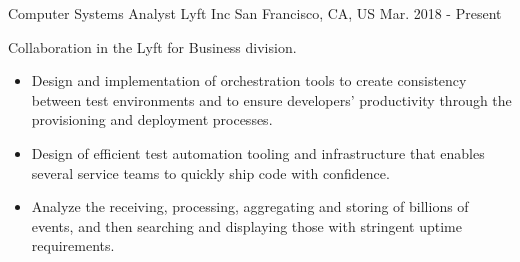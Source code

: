 


\begin{cventries}
	
	
	\cventry
	{Computer Systems Analyst} %
	{Lyft Inc} %
	{San Francisco, CA, US} %
	{Mar. 2018 - Present} %
	{ %
		\begin{cvitems}
			\item {Collaboration in the Lyft for Business division.}
			\begin{itemize}
				\item {Design and implementation of orchestration tools to create consistency between test environments and to ensure developers' productivity through the provisioning and deployment processes.}
				\item {Design of efficient test automation tooling and infrastructure that enables several service teams to quickly ship code with confidence.}
				\item {Analyze the receiving, processing, aggregating and storing of billions of events, and then searching and displaying those with stringent uptime requirements.}
			\end{itemize}
		\end{cvitems}
	}
		
	

\end{cventries}
